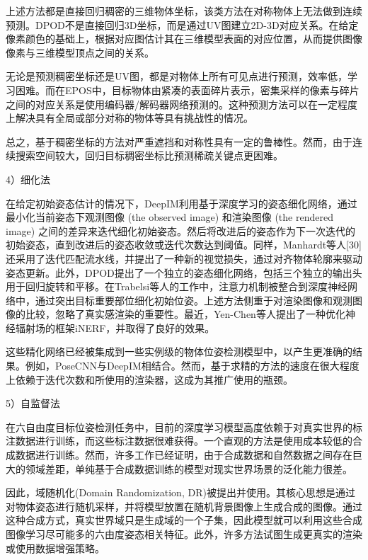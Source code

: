 \documentclass[12pt]{article}
\begin{document}
上述方法都是直接回归稠密的三维物体坐标，该类方法在对称物体上无法做到连续预测。DPOD\cite{zakharov2019dpod}不是直接回归3D坐标，而是通过UV图建立2D-3D对应关系。在给定像素颜色的基础上，根据对应图估计其在三维模型表面的对应位置，从而提供图像像素与三维模型顶点之间的关系。

无论是预测稠密坐标还是UV图，都是对物体上所有可见点进行预测，效率低，学习困难。而在EPOS\cite{hodan2020epos}中，目标物体由紧凑的表面碎片表示，密集采样的像素与碎片之间的对应关系是使用编码器/解码器网络预测的。这种预测方法可以在一定程度上解决具有全局或部分对称的物体等具有挑战性的情况。

总之，基于稠密坐标的方法对严重遮挡和对称性具有一定的鲁棒性。然而，由于连续搜索空间较大，回归目标稠密坐标比预测稀疏关键点更困难。

4）细化法

在给定初始姿态估计的情况下，DeepIM\cite{li2018deepim}利用基于深度学习的姿态细化网络，通过最小化当前姿态下观测图像 (the observed image) 和渲染图像 (the rendered image) 之间的差异来迭代细化初始姿态。然后将改进后的姿态作为下一次迭代的初始姿态，直到改进后的姿态收敛或迭代次数达到阈值。同样，Manhardt等人[30]还采用了迭代匹配流水线，并提出了一种新的视觉损失，通过对齐物体轮廓来驱动姿态更新。此外，DPOD\cite{zakharov2019dpod}提出了一个独立的姿态细化网络，包括三个独立的输出头用于回归旋转和平移。在Trabelsi等人的工作中\cite{trabelsi2021pose}，注意力机制被整合到深度神经网络中，通过突出目标重要部位细化初始位姿。上述方法侧重于对渲染图像和观测图像的比较，忽略了真实感渲染的重要性。最近，Yen-Chen等人\cite{yen2021inerf}提出了一种优化神经辐射场的框架iNERF，并取得了良好的效果。

这些精化网络已经被集成到一些实例级的物体位姿检测模型中，以产生更准确的结果。例如，PoseCNN\cite{Xiang2018}与DeepIM\cite{li2018deepim}相结合。然而，基于求精的方法的速度在很大程度上依赖于迭代次数和所使用的渲染器，这成为其推广使用的瓶颈。 

5）自监督法

在六自由度目标位姿检测任务中，目前的深度学习模型高度依赖于对真实世界的标注数据进行训练，而这些标注数据很难获得。一个直观的方法是使用成本较低的合成数据进行训练。然而，许多工作已经证明，由于合成数据和自然数据之间存在巨大的领域差距，单纯基于合成数据训练的模型对现实世界场景的泛化能力很差。

因此，域随机化(Domain Randomization, DR)\cite{tobin2017domainRandomization}被提出并使用\cite{sundermeyer2018implicit}。其核心思想是通过对物体姿态进行随机采样，并将模型放置在随机背景图像上生成合成的图像。通过这种合成方式，真实世界域只是生成域的一个子集，因此模型就可以利用这些合成图像学习尽可能多的六由度姿态相关特征。此外，许多方法试图生成更真实的渲染\cite{wang2019normalized,movshovitz2016photoRealistic,wen2020se3}或使用数据增强策略\cite{bukschat2020efficientpose,peng2019pvnet}。
\end{document}
